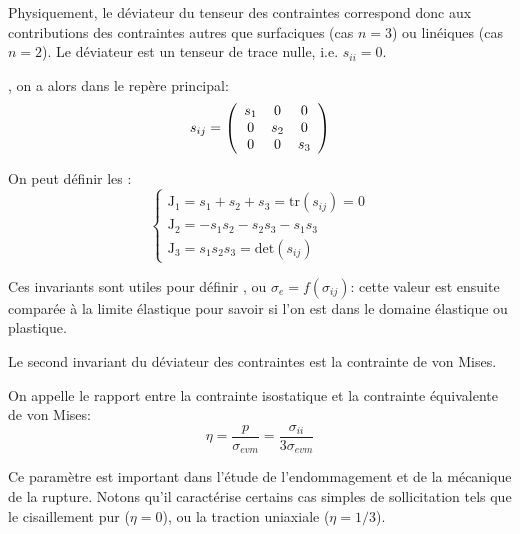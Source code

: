 \medskip
Physiquement, le déviateur du tenseur des contraintes correspond donc aux contributions des 
contraintes autres que surfaciques (cas $n = 3$) ou linéiques (cas $n = 2$).
Le déviateur est un tenseur de trace nulle, i.e. $s_{ii}=0$.

\medskip
{}, 
on a alors dans le repère principal:
\begin{equation}    s_{ij} = \left( \begin{array}{ccc} s_{1} & 0 & 0 \\ 0 & s_{2} & 0 \\ 0 & 0 & s_{3} \\ \end{array}\right) \end{equation}

On peut définir les :
\begin{equation}  
\left\{\begin{array}{l}  \mathrm{J}_1 = s_{1} + s_{2} + s_{3} = \mathrm{tr}(s_{ij}) = 0 \\
\mathrm{J}_2 = - s_1 s_2 - s_2 s_3 - s_1 s_3 \\
\mathrm{J}_3 = s_1 s_2 s_3 = \mathrm{det}(s_{ij}) 
\end{array}\right.
\end{equation}

Ces invariants sont utiles pour définir , 
ou  $\sigma_e=f(\sigma_{ij})$: 
cette valeur est ensuite comparée  à la limite élastique pour savoir si l'on est dans le domaine 
élastique ou plastique.

\medskip
Le second invariant du déviateur des contraintes est la contrainte de von 
Mises.

\medskip
On appelle  le rapport entre la contrainte 
isostatique et la contrainte équivalente de von Mises:
\begin{equation} \eta = \frac{p}{\sigma_{e vm}} = \frac{\sigma_{ii}}{3\sigma_{e vm}} \end{equation}

Ce paramètre est important dans l'étude de l'endommagement et de la mécanique de la rupture. 
Notons qu'il caractérise certains cas simples de sollicitation tels que 
le cisaillement pur ($\eta= 0$), ou la traction uniaxiale ($\eta = 1/3$).



